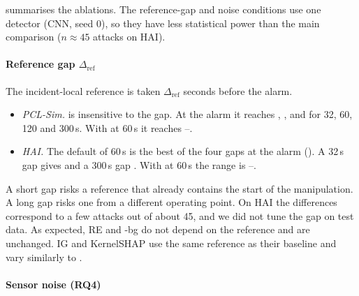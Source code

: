  summarises the ablations. The reference-gap and noise conditions use one detector (CNN, seed 0), so they have less statistical power than the main comparison ($n\approx45$ attacks on HAI).

\paragraph{Reference gap $\Delta_{\mathrm{ref}}$} The incident-local reference is taken $\Delta_{\mathrm{ref}}$ seconds before the alarm.
\begin{itemize}
\item \emph{PCL-Sim.} \LX{} is insensitive to the gap. At the alarm it reaches \ptwosimrefALXsingleZerohrOne, \ptwosimrefBLXsingleZerohrOne, \ptwosimrefCLXsingleZerohrOne{} and \ptwosimrefDLXsingleZerohrOne{} for 32, 60, 120 and 300\,s. With \TEA{} at 60\,s it reaches \ptwosimrefALXteaSixZerohrOne--\ptwosimrefDLXteaSixZerohrOne.
\item \emph{HAI.} The default of 60\,s is the best of the four gaps at the alarm (\ptwohairefBLXsingleZerohrOne). A 32\,s gap gives \ptwohairefALXsingleZerohrOne{} and a 300\,s gap \ptwohairefDLXsingleZerohrOne. With \TEA{} at 60\,s the range is \ptwohairefDLXteaSixZerohrOne--\ptwohairefBLXteaSixZerohrOne.
\end{itemize}
A short gap risks a reference that already contains the start of the manipulation. A long gap risks one from a different operating point. On HAI the differences correspond to a few attacks out of about 45, and we did not tune the gap on test data. As expected, RE and \LX-bg do not depend on the reference and are unchanged. IG and KernelSHAP use the same reference as their baseline and vary similarly to \LX.

\paragraph{Sensor noise (RQ4)}


